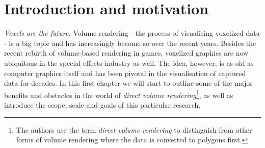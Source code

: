 \chapter{Introduction and motivation}  \label{ch:introduction}
\emph{Voxels are the future.} Volume rendering - the process of visualising voxelized data -  is a big topic and has increasingly become so over the recent years. Besides the recent rebirth of volume-based rendering in games, voxelized graphics are now ubiquitous in the special effects industry as well. The idea, however, is as old as computer graphics itself and has been pivotal in the visualisation of captured data for decades. In this first chapter we will start to outline some of the major benefits and obstacles in the world of \emph{direct volume rendering}\footnote{The authors use the term \textit{direct volume rendering} to distinguish from other forms of volume rendering where the data is converted to polygons first.}, as well as introduce the scope, scale and goals of this particular research.
%
